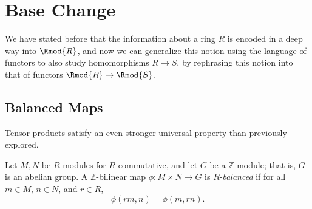 \section{Base Change}
We have stated before that the information about a ring $R$ is encoded in a deep way into $\Rmod{R} $, and now we can generalize this notion using the language of functors to also study homomorphisms $R\to S$, by rephrasing this notion into that of functors $\Rmod{R} \to \Rmod{S} $.
\subsection{Balanced Maps}
Tensor products satisfy an even stronger universal property than previously explored.
\begin{definition}[Balanced]\label{dfn:8.11}
	Let $M,N$ be $R$-modules for $R$ commutative, and let $G$ be a $\mathbb{Z} $-module; that is, $G$ is an abelian group. A $\mathbb{Z} $-bilinear map $\phi : M\times N \to G$ is $R$-\emph{balanced} if for all $m\in M$, $n\in N$, and $r\in R$,
	\[
		\phi (r m,n)=\phi (m,rn)
	.\]
\end{definition}

